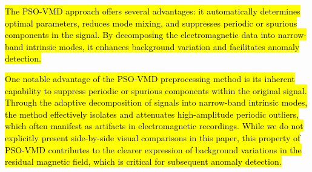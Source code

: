 \documentclass[3p,authoryear,preprint,12pt]{elsarticle}
\begin{document}
%
\hl{The PSO-VMD approach offers several advantages: it automatically determines optimal parameters, reduces mode mixing, and suppresses periodic or spurious components in the signal. By decomposing the electromagnetic data into narrow-band intrinsic modes, it enhances background variation and facilitates anomaly detection.
}

\hl{One notable advantage of the PSO-VMD preprocessing method is its inherent capability to suppress periodic or spurious components within the original signal. Through the adaptive decomposition of signals into narrow-band intrinsic modes, the method effectively isolates and attenuates high-amplitude periodic outliers, which often manifest as artifacts in electromagnetic recordings. While we do not explicitly present side-by-side visual comparisons in this paper, this property of PSO-VMD contributes to the clearer expression of background variations in the residual magnetic field, which is critical for subsequent anomaly detection.}
\end{document}
